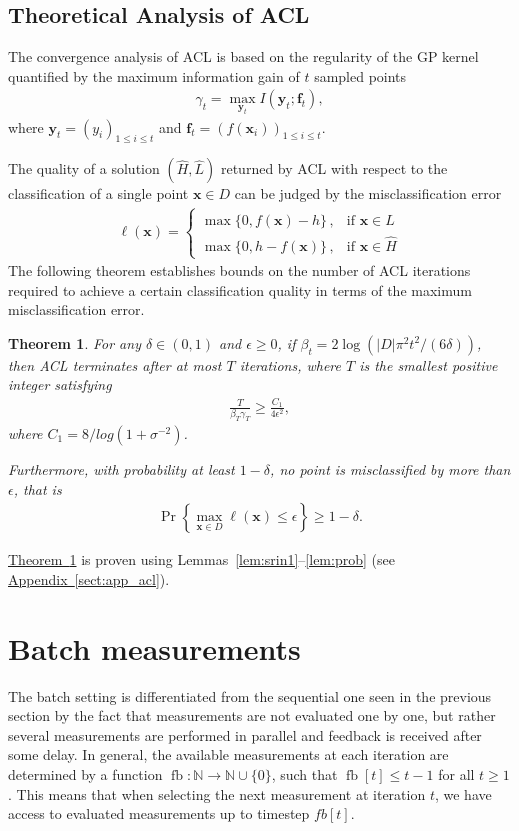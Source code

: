 \documentclass{article}
\def\*#1{\bm{#1}}
\newcommand{\theoremref}[1]{\hyperref[#1]{\mbox{Theorem~\ref*{#1}}}}
\newcommand{\appref}[1]{\hyperref[#1]{\mbox{Appendix~\ref*{#1}}}}
\newcommand{\twopartdef}[4]
{
	\left\{
		\begin{array}{ll}
			#1\,,& \mbox{if } #2 \\
			#3\,,& \mbox{if } #4
		\end{array}
	\right.
}
\newtheorem{theorem}{Theorem}
\newcommand{\acl}{\textsf{ACL}\xspace}
\newcommand{\fb}{\mathop{\mathrm{fb}}}
\begin{document}
\subsection{Theoretical Analysis of \acl}
The convergence analysis of \acl is based on the regularity of the GP kernel
quantified by the maximum information gain of $t$ sampled points
\begin{align*}
\gamma_t = \max_{\*y_t}I(\*y_t; \*f_t),
\end{align*}
where $\*y_t = (y_i)_{1\leq i\leq t}$ and
$\*f_t = (f(\*x_i))_{1\leq i\leq t}$.

The quality of a solution $(\hat{H}, \hat{L})$ returned by \acl with
respect to the classification of a single point $\*x \in D$ can be
judged by the misclassification error
\begin{align*}
\ell(\*x) = \twopartdef{\max\{0, f(\*x) - h\}}{\*x\in \hat{L}}{\max\{0, h - f(\*x)\}}{\*x\in \hat{H}}
\end{align*}
The following theorem establishes bounds on the number of \acl iterations
required to achieve a certain classification quality in terms of the
maximum misclassification error.

\begin{theorem}
\label{thm:acl}
For any $\delta \in (0, 1)$ and $\epsilon \geq 0$,
if $\beta_t = 2\log(|D|\pi^2 t^2/(6\delta))$, then \acl terminates after
at most $T$ iterations, where $T$ is the smallest positive integer
satisfying
\begin{align*}
\frac{T}{\beta_T \gamma_T} \geq \frac{C_1}{4\epsilon^2},
\end{align*}
where $C_1 = 8/log(1 + \sigma^{-2})$.

Furthermore, with probability at least $1-\delta$, no point is
misclassified by more than $\epsilon$, that is
\begin{align*}
\Pr\left\{\max_{\*x\in D}\ell(\*x) \leq \epsilon\right\} \geq 1 - \delta.
\end{align*}
\end{theorem}

\theoremref{thm:acl} is proven using
Lemmas~\ref{lem:srin1}--\ref{lem:prob} (see \appref{sect:app_acl}).

\section{Batch measurements}
The batch setting is differentiated from the sequential one seen in the
previous section by the
fact that measurements are not evaluated one by one, but rather several
measurements are performed in parallel and feedback is received after
some delay. In general, the available measurements at each iteration
are determined by a function
$\fb : \mathbb{N} \to \mathbb{N}\cup\{0\}$, such that
$\fb[t] \leq t-1$ for all $t \geq 1$. This means that when selecting
the next measurement at iteration $t$, we have access to evaluated
measurements up to timestep $fb[t]$.
\end{document}
